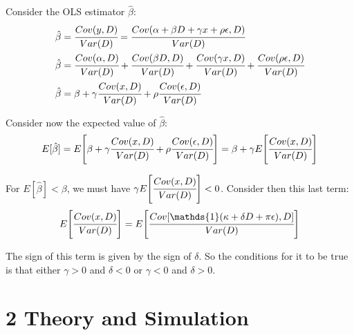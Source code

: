 \documentclass[a4paper,12pt,oneside,English]{article}
\begin{document}
Consider the OLS estimator $\hat\beta$:
\begin{equation}
\begin{split}
\hat\beta&=\cfrac{Cov(y,D)}{Var(D)}=\cfrac{Cov(\alpha+\beta D + \gamma x + \rho \epsilon,D)}{Var(D)}\\
\hat\beta&=\cfrac{Cov(\alpha,D)}{Var(D)}+\cfrac{Cov(\beta D,D)}{Var(D)}+\cfrac{Cov(\gamma x,D)}{Var(D)}+\cfrac{Cov(\rho\epsilon,D)}{Var(D)}\\
\hat\beta&=\beta+\gamma\cfrac{Cov(x,D)}{Var(D)}+\rho\cfrac{Cov(\epsilon,D)}{Var(D)}
\end{split}
\end{equation}

Consider now the expected value of $\hat\beta$:
\begin{equation}
E[\hat\beta]=E\Biggl[\beta+\gamma\cfrac{Cov(x,D)}{Var(D)}+\rho\cfrac{Cov(\epsilon,D)}{Var(D)}\Biggr]=\beta + \gamma E\Biggl[\cfrac{Cov(x,D)}{Var(D)}\Biggr]   
\end{equation}

For $E[\hat\beta]<\beta$, we must have $\gamma E\Biggl[\cfrac{Cov(x,D)}{Var(D)}\Biggr]<0$. Consider then this last term:
\begin{equation}
    E\Biggl[\cfrac{Cov(x,D)}{Var(D)}\Biggr]=E\Biggl[\cfrac{Cov[\mathds{1}(\kappa+\delta D+\pi \epsilon),D]}{Var(D)}\Biggr]
\end{equation}

The sign of this term is given by the sign of $\delta$. So the conditions for it to be true is that either $\gamma>0$ and $\delta<0$ or $\gamma<0$ and $\delta>0$.

\newpage
\section{2 Theory and Simulation}
\end{document}
